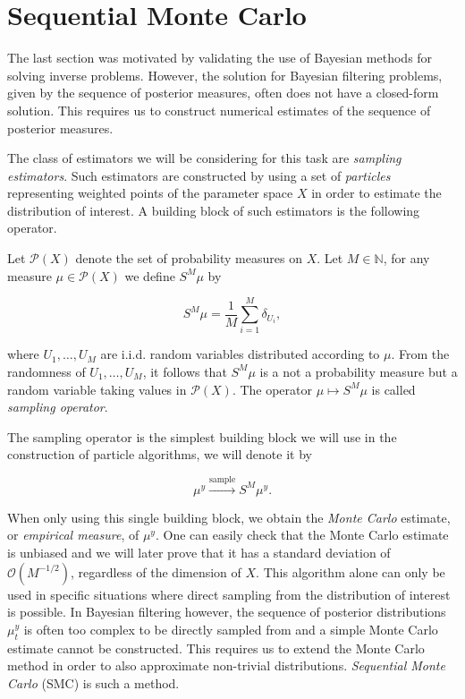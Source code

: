 \section{Sequential Monte Carlo}
The last section was motivated by validating the use of Bayesian methods for solving inverse problems. However, the solution for Bayesian filtering problems, given by the sequence of posterior measures, often does not have a closed-form solution. This requires us to construct numerical estimates of the sequence of posterior measures.

The class of estimators we will be considering for this task are \textit{sampling estimators}. Such estimators are constructed by using a set of \textit{particles} representing weighted points of the parameter space $X$ in order to estimate the distribution of interest. A building block of such estimators is the following operator.

\begin{definition}
  Let $\mathcal{P}(X)$ denote the set of probability measures on $X$. Let $M \in \mathbb{N}$, for any measure $\mu \in \mathcal{P}(X)$ we define $S^M\mu$ by

  \begin{equation*}
    S^M\mu = \frac1{M}\sum_{i=1}^M\delta_{U_i},
  \end{equation*}

  where $U_1, \ldots, U_M$ are i.i.d. random variables distributed according to $\mu$. From the randomness of $U_1, \ldots, U_M$, it follows that $S^M\mu$ is a not a probability measure but a random variable taking values in $\mathcal{P}(X)$. The operator $\mu \mapsto S^M\mu$ is called \textit{sampling operator}.
\end{definition}

The sampling operator is the simplest building block we will use in the construction of particle algorithms, we will denote it by
 
\begin{equation*}
  \mu^y \xrightarrow{\text{sample}} S^M\mu^y.
\end{equation*}

When only using this single building block, we obtain the \textit{Monte Carlo} estimate, or \textit{empirical measure}, of $\mu^y$. One can easily check that the Monte Carlo estimate is unbiased and we will later prove that it has a standard deviation of $\mathcal{O}(M^{-1/2})$, regardless of the dimension of $X$. This algorithm alone can only be used in specific situations where direct sampling from the distribution of interest is possible. In Bayesian filtering however, the sequence of posterior distributions $\mu^y_t$ is  often too complex to be directly sampled from and a simple Monte Carlo estimate cannot be constructed. This requires us to extend the Monte Carlo method in order to also approximate non-trivial distributions. \textit{Sequential Monte Carlo} (SMC) is such a method.

